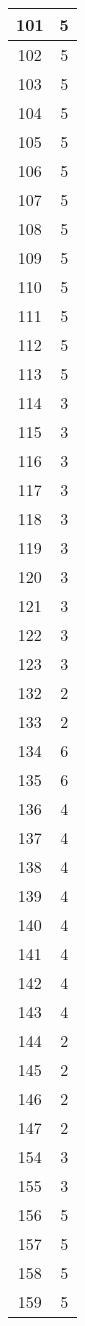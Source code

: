 \documentclass[letterpaper, 12pt]{article}
\begin{document}
\begin{longtable}{|c|c|}
\hline
101 & 5 \\
\hline
102 & 5 \\
\hline
103 & 5 \\
\hline
104 & 5 \\
\hline
105 & 5 \\
\hline
106 & 5 \\
\hline
107 & 5 \\
\hline
108 & 5 \\
\hline
109 & 5 \\
\hline
110 & 5 \\
\hline
111 & 5 \\
\hline
112 & 5 \\
\hline
113 & 5 \\
\hline
114 & 3 \\
\hline
115 & 3 \\
\hline
116 & 3 \\
\hline
117 & 3 \\
\hline
118 & 3 \\
\hline
119 & 3 \\
\hline
120 & 3 \\
\hline
121 & 3 \\
\hline
122 & 3 \\
\hline
123 & 3 \\
\hline
132 & 2 \\
\hline
133 & 2 \\
\hline
134 & 6 \\
\hline
135 & 6 \\
\hline
136 & 4 \\
\hline
137 & 4 \\
\hline
138 & 4 \\
\hline
139 & 4 \\
\hline
140 & 4 \\
\hline
141 & 4 \\
\hline
142 & 4 \\
\hline
143 & 4 \\
\hline
144 & 2 \\
\hline
145 & 2 \\
\hline
146 & 2 \\
\hline
147 & 2 \\
\hline
154 & 3 \\
\hline
155 & 3 \\
\hline
156 & 5 \\
\hline
157 & 5 \\
\hline
158 & 5 \\
\hline
159 & 5 \\

\end{longtable}
\end{document}
